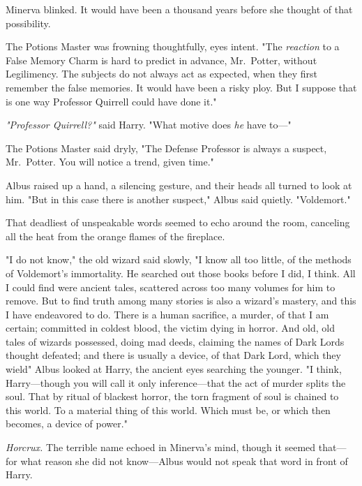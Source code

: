 Minerva blinked. It would have been a thousand years before she
thought of that possibility.

The Potions Master was frowning thoughtfully, eyes intent. "The \emph{reaction}
to a False Memory Charm is hard to predict in advance, Mr.~Potter, without
Legilimency. The subjects do not always act as expected, when they first
remember the false memories. It would have been a risky ploy. But I suppose
that is one way Professor Quirrell could have done it."

\emph{"Professor Quirrell?"} said Harry. "What motive does \emph{he} have to\mbox{---}"

The Potions Master said dryly, "The Defense Professor is always a suspect,
Mr.~Potter. You will notice a trend, given time."

Albus raised up a hand, a silencing gesture, and their heads all turned to look
at him. "But in this case there is another suspect," Albus said quietly.
"Voldemort."

That deadliest of unspeakable words seemed to echo around the room, canceling
all the heat from the orange flames of the fireplace.

"I do not know," the old wizard said slowly, "I know all too little, of the
methods of Voldemort's immortality. He searched out those books before I did, I
think. All I could find were ancient tales, scattered across too many volumes
for him to remove. But to find truth among many stories is also a wizard's
mastery, and this I have endeavored to do. There is a human sacrifice, a
murder, of that I am certain; committed in coldest blood, the victim dying in
horror. And old, old tales of wizards possessed, doing mad deeds, claiming the
names of Dark Lords thought defeated; and there is usually a device, of that
Dark Lord, which they wield{\el}" Albus looked at Harry, the ancient eyes
searching the younger. "I think, Harry---though you will call it only
inference---that the act of murder splits the soul. That by ritual of blackest
horror, the torn fragment of soul is chained to this world. To a material thing
of this world. Which must be, or which then becomes, a device of power."

\emph{Horcrux.} The terrible name echoed in Minerva's mind, though it seemed
that---for what reason she did not know---Albus would not speak that word in
front of Harry.

